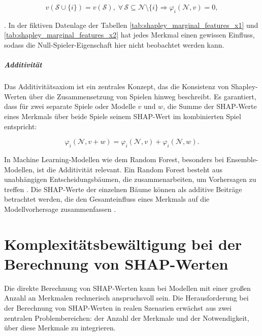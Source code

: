 \begin{equation}
    v(\mathcal{S} \cup \{i\}) =  v(\mathcal{S}), \; \forall\, \mathcal{S} \subseteq \mathcal{N} \setminus \{i\} \Rightarrow \varphi_i (\mathcal{N}, v) = 0,
\end{equation}

\cite[S. 222]{Molnar_2022}. In der fiktiven Datenlage der Tabellen \ref{tab:shapley_marginal_features_x1} und \ref{tab:shapley_marginal_features_x2} hat jedes Merkmal 
einen gewissen Einfluss, sodass die Null-Spieler-Eigenschaft hier nicht beobachtet werden kann.

\paragraph{\rmfamily\bfseries Additivität}

Das Additivitätsaxiom ist ein zentrales Konzept, das die Konsistenz von Shapley-Werten 
über die Zusammensetzung von Spielen hinweg beschreibt. Es garantiert, 
dass für zwei separate Spiele oder Modelle \(v\) und \(w\), die Summe der SHAP-Werte eines 
Merkmals über beide Spiele seinem SHAP-Wert im kombinierten Spiel entspricht:

\begin{equation}
    \varphi_i(\mathcal{N}, v + w) = \varphi_i (\mathcal{N}, v) + \varphi_i (\mathcal{N}, w).
\end{equation}

In Machine Learning-Modellen wie dem Random Forest, besonders bei Ensemble-Modellen, 
ist die Additivität relevant. Ein Random Forest besteht aus unabhängigen Entscheidungsbäumen, 
die zusammenarbeiten, um Vorhersagen zu treffen \cite[S. 97]{Molnar_2023}. Die SHAP-Werte der einzelnen Bäume 
können als additive Beiträge betrachtet werden, die den Gesamteinfluss eines Merkmals 
auf die Modellvorhersage zusammenfassen \cite[S. 32]{Molnar_2023}.

\chapter{Komplexitätsbewältigung bei der Berechnung von SHAP-Werten}
\label{sec:estimators}

Die direkte Berechnung von SHAP-Werten kann bei Modellen mit einer 
großen Anzahl an Merkmalen rechnerisch anspruchsvoll sein. Die Herausforderung bei der Berechnung von SHAP-Werten in realen Szenarien erwächst aus 
zwei zentralen Problembereichen: der Anzahl der Merkmale und der Notwendigkeit, 
über diese Merkmale zu integrieren. 

